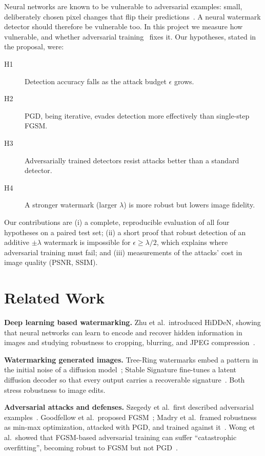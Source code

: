 \documentclass[sigconf, nonacm]{acmart}
\begin{document}
Neural networks are known to be vulnerable to adversarial examples: small, deliberately chosen
pixel changes that flip their predictions~\cite{paper7,paper2}. A neural watermark detector
should therefore be vulnerable too. In this project we measure how vulnerable, and whether
adversarial training~\cite{paper3} fixes it. Our hypotheses, stated in the proposal, were:
\begin{description}
  \item[H1] Detection accuracy falls as the attack budget $\epsilon$ grows.
  \item[H2] PGD, being iterative, evades detection more effectively than single-step FGSM.
  \item[H3] Adversarially trained detectors resist attacks better than a standard detector.
  \item[H4] A stronger watermark (larger $\lambda$) is more robust but lowers image fidelity.
\end{description}
\noindent Our contributions are (i) a complete, reproducible evaluation of all four hypotheses on
a paired test set; (ii) a short proof that robust detection of an additive $\pm\lambda$ watermark
is impossible for $\epsilon \ge \lambda/2$, which explains where adversarial training must fail;
and (iii) measurements of the attacks' cost in image quality (PSNR, SSIM).

\section{Related Work}
\textbf{Deep learning based watermarking.} Zhu et al.\ introduced HiDDeN, showing that neural
networks can learn to encode and recover hidden information in images and studying robustness to
cropping, blurring, and JPEG compression~\cite{paper4}.

\textbf{Watermarking generated images.} Tree-Ring watermarks embed a pattern in the initial noise
of a diffusion model~\cite{paper5}; Stable Signature fine-tunes a latent diffusion decoder so that
every output carries a recoverable signature~\cite{paper6}. Both stress robustness to image edits.

\textbf{Adversarial attacks and defenses.} Szegedy et al.\ first described adversarial
examples~\cite{paper7}. Goodfellow et al.\ proposed FGSM~\cite{paper2}; Madry et al.\ framed
robustness as min-max optimization, attacked with PGD, and trained against it~\cite{paper3}.
Wong et al.\ showed that FGSM-based adversarial training can suffer ``catastrophic overfitting'',
becoming robust to FGSM but not PGD~\cite{wong2020fast}.
\end{document}
